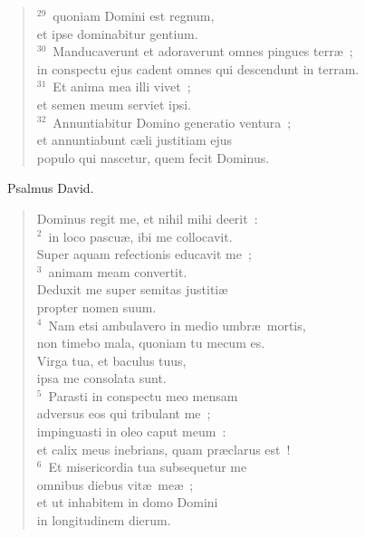 \begin{flushleft}
\begin{verse}
${}^{29}$~quoniam Domini est regnum,\\ et ipse dominabitur gentium.\\
${}^{30}$~Manducaverunt et adoraverunt omnes pingues terr\ae~;\\ in conspectu ejus cadent omnes qui descendunt in terram.\\
${}^{31}$~Et anima mea illi vivet~;\\ et semen meum serviet ipsi.\\
${}^{32}$~Annuntiabitur Domino generatio ventura~;\\ et annuntiabunt c\ae li justitiam ejus\\ populo qui nascetur, quem fecit Dominus.\end{verse}\end{flushleft}


~\lettrine[lines=10,image=true,loversize=0.05,lraise=-0.03]{P}{}salmus David. \begin{flushleft}\begin{verse}\vspace{6pt}Dominus regit me, et nihil mihi deerit~:\\
${}^{2}$~in loco pascu\ae , ibi me collocavit.\\ Super aquam refectionis educavit me~;\\
${}^{3}$~animam meam convertit.\\ Deduxit me super semitas justiti\ae \\ propter nomen suum.\\
${}^{4}$~Nam etsi ambulavero in medio umbr\ae\ mortis,\\ non timebo mala, quoniam tu mecum es.\\ Virga tua, et baculus tuus,\\ ipsa me consolata sunt.\\
${}^{5}$~Parasti in conspectu meo mensam\\ adversus eos qui tribulant me~;\\ impinguasti in oleo caput meum~:\\ et calix meus inebrians, quam pr\ae clarus est~!\\
${}^{6}$~Et misericordia tua subsequetur me\\ omnibus diebus vit\ae\ me\ae~;\\ et ut inhabitem in domo Domini\\ in longitudinem dierum.\end{verse}\end{flushleft}


